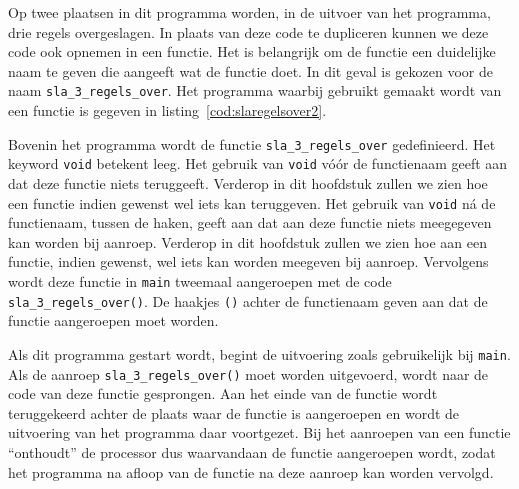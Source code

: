 
Op twee plaatsen in dit programma worden, in de uitvoer van het programma, drie regels overgeslagen.
In plaats van deze code te dupliceren kunnen we deze code ook opnemen in een functie.
Het is belangrijk om de functie een duidelijke naam te geven die aangeeft wat de functie doet.
In dit geval is gekozen voor de naam \texttt{sla\_3\_regels\_over}.
Het programma waarbij gebruikt gemaakt wordt van een functie is gegeven in listing~\ref{cod:slaregelsover2}.


Bovenin het programma wordt de functie \texttt{sla\_3\_regels\_over} gedefinieerd.
Het keyword \texttt{void} betekent leeg.
Het gebruik van \texttt{void} vóór de functienaam geeft aan dat deze functie niets teruggeeft.
Verderop in dit hoofdstuk zullen we zien hoe een functie indien gewenst wel iets kan teruggeven.
Het gebruik van \texttt{void} n\'a de functienaam, tussen de haken, geeft aan dat aan deze functie niets meegegeven kan worden bij aanroep. 
Verderop in dit hoofdstuk zullen we zien hoe aan een functie, indien gewenst, wel iets kan worden meegeven bij aanroep.
Vervolgens wordt deze functie in \texttt{main} tweemaal aangeroepen met de code \texttt{sla\_3\_regels\_over()}.
De haakjes \texttt{()} achter de functienaam geven aan dat de functie aangeroepen moet worden.
 
Als dit programma gestart wordt, begint de uitvoering zoals gebruikelijk bij \texttt{main}.
Als de aanroep \texttt{sla\_3\_regels\_over()} moet worden uitgevoerd, wordt naar de code van deze functie gesprongen.
Aan het einde van de functie wordt teruggekeerd achter de plaats waar de functie is aangeroepen en wordt de uitvoering van het programma daar voortgezet.
Bij het aanroepen van een functie ``onthoudt'' de processor dus waarvandaan de functie aangeroepen wordt, zodat het programma na afloop van de functie na deze aanroep kan worden vervolgd.

